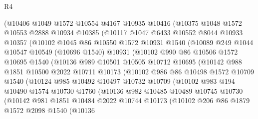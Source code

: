 \begin{lexlean}{R4}
\begin{coremodule}
      (@10406
        @1049
        @1572
        @10554
        @4167
        @10935
        @10416
        (@10375
          @1048
          @1572
          @10553
          @2888
          @10934
          @10385
          (@10117
            @1047
            @6433
            @10552
            @8044
            @10933
            @10357
            (@10102
              @1045
              @86
              @10550
              @1572
              @10931
              @1540
              (@10089
                @249
                @1044
                @10547
                @10549
                (@10696 @1540)
                @10931
                (@10102
                  @990
                  @86
                  @10506
                  @1572
                  @10695
                  @1540
                  (@10136
                    @989
                    @10501
                    @10505
                    @10712
                    @10695
                    (@10142
                      @988
                      @1851
                      @10500
                      @2022
                      @10711
                      @10173
                      (@10102
                        @986
                        @86
                        @10498
                        @1572
                        @10709
                        @1540
                        (@10124
                          @985
                          @10492
                          @10497
                          @10732
                          @10709
                          (@10102
                            @983
                            @194
                            @10490
                            @1574
                            @10730
                            @1760
                            (@10136
                              @982
                              @10485
                              @10489
                              @10745
                              @10730
                              (@10142
                                @981
                                @1851
                                @10484
                                @2022
                                @10744
                                @10173
                                (@10102
                                  @206
                                  @86
                                  @1879
                                  @1572
                                  @2098
                                  @1540
                                  (@10136

\end{coremodule}
\end{lexlean}
